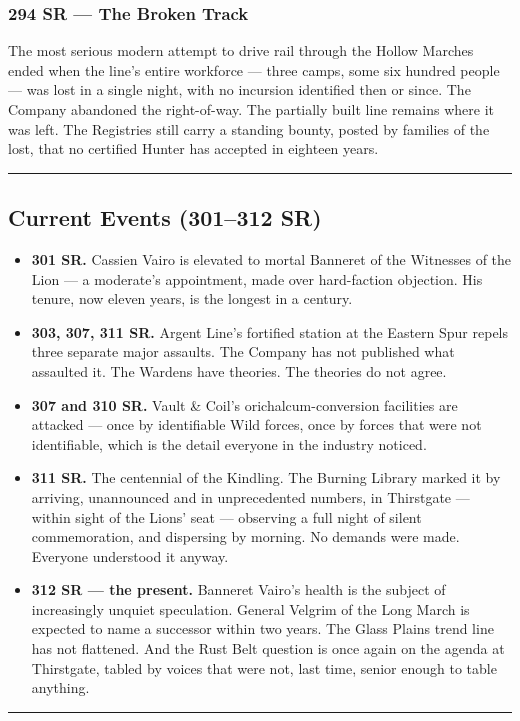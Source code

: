 \subsubsection{294 SR --- The Broken Track}

The most serious modern attempt to drive rail through the Hollow Marches ended when the line's entire workforce --- three camps, some six hundred people --- was lost in a single night, with no incursion identified then or since. The Company abandoned the right-of-way. The partially built line remains where it was left. The Registries still carry a standing bounty, posted by families of the lost, that no certified Hunter has accepted in eighteen years.

\medskip\hrule\medskip

\subsection{Current Events (301--312 SR)}

\begin{itemize}
    \item \textbf{301 SR.} Cassien Vairo is elevated to mortal Banneret of the Witnesses of the Lion --- a moderate's appointment, made over hard-faction objection. His tenure, now eleven years, is the longest in a century.
    \item \textbf{303, 307, 311 SR.} Argent Line's fortified station at the Eastern Spur repels three separate major assaults. The Company has not published what assaulted it. The Wardens have theories. The theories do not agree.
    \item \textbf{307 and 310 SR.} Vault \& Coil's orichalcum-conversion facilities are attacked --- once by identifiable Wild forces, once by forces that were not identifiable, which is the detail everyone in the industry noticed.
    \item \textbf{311 SR.} The centennial of the Kindling. The Burning Library marked it by arriving, unannounced and in unprecedented numbers, in Thirstgate --- within sight of the Lions' seat --- observing a full night of silent commemoration, and dispersing by morning. No demands were made. Everyone understood it anyway.
    \item \textbf{312 SR --- the present.} Banneret Vairo's health is the subject of increasingly unquiet speculation. General Velgrim of the Long March is expected to name a successor within two years. The Glass Plains trend line has not flattened. And the Rust Belt question is once again on the agenda at Thirstgate, tabled by voices that were not, last time, senior enough to table anything.
\end{itemize}

\medskip\hrule\medskip

